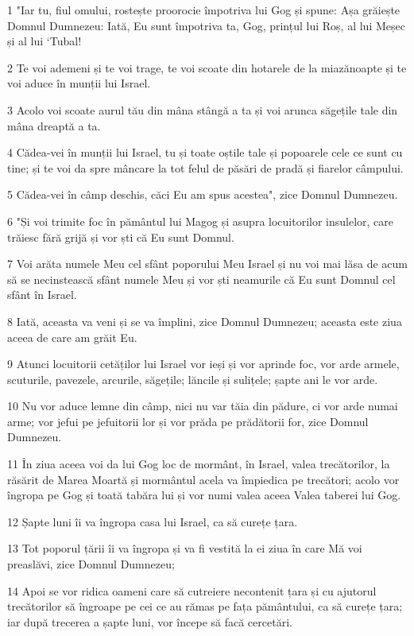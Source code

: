 \par 1 "Iar tu, fiul omului, rostește proorocie împotriva lui Gog și spune: Așa grăiește Domnul Dumnezeu: Iată, Eu sunt împotriva ta, Gog, prințul lui Roș, al lui Meșec și al lui `Tubal!
\par 2 Te voi ademeni și te voi trage, te voi scoate din hotarele de la miazănoapte și te voi aduce în munții lui Israel.
\par 3 Acolo voi scoate aurul tău din mâna stângă a ta și voi arunca săgețile tale din mâna dreaptă a ta.
\par 4 Cădea-vei în munții lui Israel, tu și toate oștile tale și popoarele cele ce sunt cu tine; și te voi da spre mâncare la tot felul de păsări de pradă și fiarelor câmpului.
\par 5 Cădea-vei în câmp deschis, căci Eu am spus acestea", zice Domnul Dumnezeu.
\par 6 "Și voi trimite foc în pământul lui Magog și asupra locuitorilor insulelor, care trăiesc fără grijă și vor ști că Eu sunt Domnul.
\par 7 Voi arăta numele Meu cel sfânt poporului Meu Israel și nu voi mai lăsa de acum să se necinstească sfânt numele Meu și vor ști neamurile că Eu sunt Domnul cel sfânt în Israel.
\par 8 Iată, aceasta va veni și se va împlini, zice Domnul Dumnezeu; aceasta este ziua aceea de care am grăit Eu.
\par 9 Atunci locuitorii cetăților lui Israel vor ieși și vor aprinde foc, vor arde armele, scuturile, pavezele, arcurile, săgețile; lăncile și sulițele; șapte ani le vor arde.
\par 10 Nu vor aduce lemne din câmp, nici nu var tăia din pădure, ci vor arde numai arme; vor jefui pe jefuitorii lor și vor prăda pe prădătorii for, zice Domnul Dumnezeu.
\par 11 În ziua aceea voi da lui Gog loc de mormânt, în Israel, valea trecătorilor, la răsărit de Marea Moartă și mormântul acela va împiedica pe trecători; acolo vor îngropa pe Gog și toată tabăra lui și vor numi valea aceea Valea taberei lui Gog.
\par 12 Șapte luni îi va îngropa casa lui Israel, ca să curețe țara.
\par 13 Tot poporul țării îi va îngropa și va fi vestită la ei ziua în care Mă voi preaslăvi, zice Domnul Dumnezeu;
\par 14 Apoi se vor ridica oameni care să cutreiere necontenit țara și cu ajutorul trecătorilor să îngroape pe cei ce au rămas pe fața pământului, ca să curețe țara; iar după trecerea a șapte luni, vor începe să facă cercetări.
